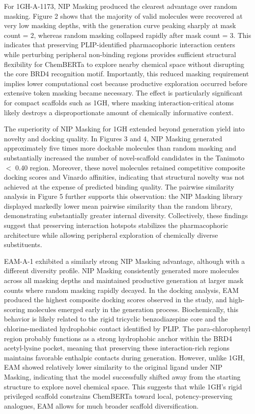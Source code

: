 \documentclass[a4paper,12pt]{article}
\begin{document}
For 1GH-A-1173, NIP Masking  produced the clearest advantage over random masking. Figure 2 shows that the majority of valid molecules were recovered at very low masking depths, with the generation curve peaking sharply at mask count = 2, whereas random masking collapsed rapidly after mask count = 3. This indicates that preserving PLIP-identified pharmacophoric interaction centers while perturbing peripheral non-binding regions provides sufficient structural flexibility for ChemBERTa to explore nearby chemical space without disrupting the core BRD4 recognition motif. Importantly, this reduced masking requirement implies lower computational cost because productive exploration occurred before extensive token masking became necessary. The effect is particularly significant for compact scaffolds such as 1GH, where masking interaction-critical atoms likely destroys a disproportionate amount of chemically informative context.

The superiority of NIP Masking  for 1GH extended beyond generation yield into novelty and docking quality. In Figures 3 and 4, NIP Masking  generated approximately five times more dockable molecules than random masking and substantially increased the number of novel-scaffold candidates in the Tanimoto$<$ 0.40 region. Moreover, these novel molecules retained competitive composite docking scores and Vinardo affinities, indicating that structural novelty was not achieved at the expense of predicted binding quality. The pairwise similarity analysis in Figure 5 further supports this observation: the NIP Masking library displayed markedly lower mean pairwise similarity than the random library, demonstrating substantially greater internal diversity. Collectively, these findings suggest that preserving interaction hotspots stabilizes the pharmacophoric architecture while allowing peripheral exploration of chemically diverse substituents.

EAM-A-1 exhibited a similarly strong NIP Masking advantage, although with a different diversity profile. NIP Masking  consistently generated more molecules across all masking depths and maintained productive generation at larger mask counts where random masking rapidly decayed. In the docking analysis, EAM produced the highest composite docking scores observed in the study, and high-scoring molecules emerged early in the generation process. Biochemically, this behavior is likely related to the rigid tricyclic benzodiazepine core and the chlorine-mediated hydrophobic contact identified by PLIP. The para-chlorophenyl region probably functions as a strong hydrophobic anchor within the BRD4 acetyl-lysine pocket, meaning that preserving these interaction-rich regions maintains favorable enthalpic contacts during generation. However, unlike 1GH, EAM showed relatively lower similarity to the original ligand under NIP Masking, indicating that the model successfully shifted away from the starting structure to explore novel chemical space. This suggests that while 1GH's rigid privileged scaffold constrains ChemBERTa toward local, potency-preserving analogues, EAM allows for much broader scaffold diversification.
\end{document}
